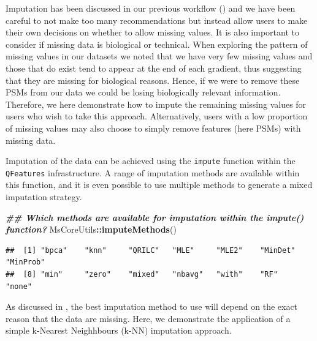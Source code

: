 \documentclass[9pt,a4paper,]{extarticle}
\newenvironment{Shaded}{\begin{snugshade}}{\end{snugshade}}
\newcommand{\DocumentationTok}[1]{\textcolor[rgb]{0.56,0.35,0.01}{\textbf{\textit{#1}}}}
\newcommand{\FunctionTok}[1]{\textcolor[rgb]{0.13,0.29,0.53}{\textbf{#1}}}
\newcommand{\NormalTok}[1]{#1}
\newcommand{\SpecialCharTok}[1]{\textcolor[rgb]{0.81,0.36,0.00}{\textbf{#1}}}
\begin{document}
Imputation has been discussed in our previous workflow (\citet{Hutchings2023})
and we have been careful to not make too many recommendations but instead allow
users to make their own decisions on whether to allow missing values. It is also
important to consider if missing data is biological or technical. When exploring
the pattern of missing values in our datasets we noted that we have very few
missing values and those that do exist tend to appear at the end of each gradient,
thus suggesting that they are missing for biological reasons. Hence, if we were
to remove these PSMs from our data we could be losing biologically relevant
information. Therefore, we here demonstrate how to impute the remaining missing
values for users who wish to take this approach. Alternatively, users with a low
proportion of missing values may also choose to simply remove features (here
PSMs) with missing data.

Imputation of the data can be achieved using the \texttt{impute} function within the
\texttt{QFeatures} infrastructure. A range of imputation methods are available within
this function, and it is even possible to use multiple methods to generate a
mixed imputation strategy.

\begin{Shaded}
\begin{Highlighting}[]
\DocumentationTok{\#\# Which methods are available for imputation within the impute() function?}
\NormalTok{MsCoreUtils}\SpecialCharTok{::}\FunctionTok{imputeMethods}\NormalTok{()}
\end{Highlighting}
\end{Shaded}

\begin{verbatim}
##  [1] "bpca"    "knn"     "QRILC"   "MLE"     "MLE2"    "MinDet"  "MinProb"
##  [8] "min"     "zero"    "mixed"   "nbavg"   "with"    "RF"      "none"
\end{verbatim}

As discussed in \citet{Hutchings2023}, the best imputation method to use will depend on
the exact reason that the data are missing. Here, we demonstrate the application
of a simple k-Nearest Neighhbours (k-NN) imputation approach.
\end{document}
